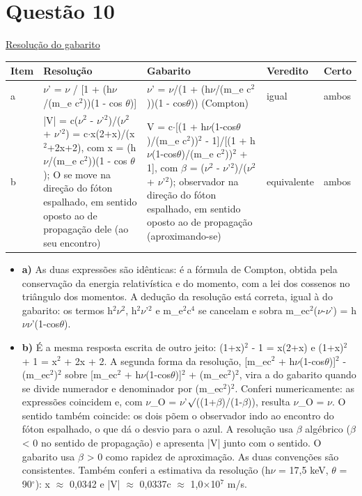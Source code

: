 \documentclass{article}%
\begin{document}
\section*{Questão 10}%
\href{https://poliedroresolve.sistemapoliedro.com.br/vestibulares/ita/2027/ita-2-fase-dia-3-22-10-2026-2-fase-dia-3/dissertativa-10-fisica-2-fase-dia-3-ita-2027}{Resolução do gabarito}\par\smallskip%
\begin{longtable}{@{}p{} p{} p{} p{} p{}@{}}\toprule Item & Resolução & Gabarito & Veredito & Certo \\ \midrule
a & $\nu$' = $\nu$ / {[}1 + (h$\nu$/(m\_e c$^2$))(1 - cos $\theta$){]} & $\nu$' = $\nu$/(1 + (h$\nu$/(m\_e c$^2$))(1 - cos$\theta$)) (Compton) & igual & ambos \\
b & |V| = c($\nu$$^2$ - $\nu$'$^2$)/($\nu$$^2$ + $\nu$'$^2$) = c$\cdot$x(2+x)/(x$^2$+2x+2), com x = (h$\nu$/(m\_e c$^2$))(1 - cos $\theta$); O se move na direção do fóton espalhado, em sentido oposto ao de propagação dele (ao seu encontro) & V = c$\cdot${[}(1 + h$\nu$(1-cos$\theta$)/(m\_e c$^2$))$^2$ - 1{]}/{[}(1 + h$\nu$(1-cos$\theta$)/(m\_e c$^2$))$^2$ + 1{]}, com $\beta$ = ($\nu$$^2$ - $\nu$'$^2$)/($\nu$$^2$ + $\nu$'$^2$); observador na direção do fóton espalhado, em sentido oposto ao de propagação (aproximando{-}se) & equivalente & ambos \\
\bottomrule\end{longtable}%
\begin{itemize}%
\item%
\textbf{a)} As duas expressões são idênticas: é a fórmula de Compton, obtida pela conservação da energia relativística e do momento, com a lei dos cossenos no triângulo dos momentos. A dedução da resolução está correta, igual à do gabarito: os termos h$^2$$\nu$$^2$, h$^2$$\nu$'$^2$ e m\_e$^2$c$^{4}$ se cancelam e sobra m\_ec$^2$($\nu$-$\nu$') = h$\nu$$\nu$'(1-cos$\theta$).%
\item%
\textbf{b)} É a mesma resposta escrita de outro jeito: (1+x)$^2$ - 1 = x(2+x) e (1+x)$^2$ + 1 = x$^2$ + 2x + 2. A segunda forma da resolução, {[}m\_ec$^2$ + h$\nu$(1-cos$\theta$){]}$^2$ - (m\_ec$^2$)$^2$ sobre {[}m\_ec$^2$ + h$\nu$(1-cos$\theta$){]}$^2$ + (m\_ec$^2$)$^2$, vira a do gabarito quando se divide numerador e denominador por (m\_ec$^2$)$^2$. Conferi numericamente: as expressões coincidem e, com $\nu$\_O = $\nu$'$\surd$((1+$\beta$)/(1-$\beta$)), resulta $\nu$\_O = $\nu$. O sentido também coincide: os dois põem o observador indo ao encontro do fóton espalhado, o que dá o desvio para o azul. A resolução usa $\beta$ algébrico ($\beta$ < 0 no sentido de propagação) e apresenta |V| junto com o sentido. O gabarito usa $\beta$ > 0 como rapidez de aproximação. As duas convenções são consistentes. Também conferi a estimativa da resolução (h$\nu$ = 17,5 keV, $\theta$ = 90$^\circ$): x $\approx$ 0,0342 e |V| $\approx$ 0,0337c $\approx$ 1,0$\times$10$^{7}$ m/s.%
\end{itemize}%
\end{document}
